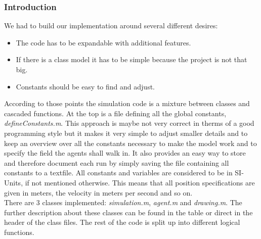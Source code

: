 \subsubsection{Introduction}
We had to build our implementation around several different desires:
\begin{itemize}
\item The code has to be expandable with additional features.
\item If there is a class model it has to be simple because the project
is not that big.
\item Constants should be easy to find and adjust.
\end{itemize}
\noi According to those points the simulation code is a mixture between classes and cascaded functions. At the top is a file defining all the global constants, \textit{defineConstants.m}. This approach is maybe not very correct in therms of a good programming style but it makes it very simple to adjust smaller details and to keep an overview over all the constants necessary to make the model work and to specify the field the agents shall walk in. It also provides an easy way to store and therefore document each run by simply saving the file containing all constants to a textfile. All constants and variables are considered to be in SI-Units, if not mentioned otherwise. This means that all position specifications are given in meters, the velocity in meters per second and so on.\\

\noi There are 3 classes implemented: \textit{simulation.m}, \textit{agent.m} and \textit{drawing.m}. The further description about these classes can be found in the table or direct in the header of the class files. The rest of the code is split up into different logical functions.\\

